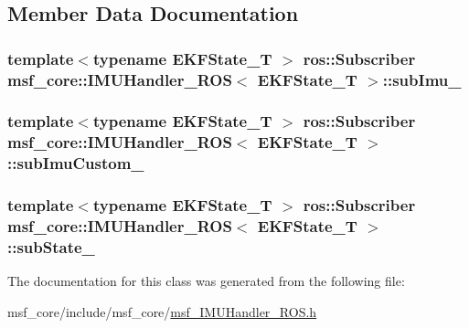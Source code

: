 \subsection{Member Data Documentation}
\hypertarget{classmsf__core_1_1IMUHandler__ROS_a32b7e18f5fc3bf0a7de15ab8ca0bc9f9}{
\subsubsection[{sub\-Imu\-\_\-}]{\setlength{\rightskip}{0pt plus 5cm}template$<$typename E\-K\-F\-State\-\_\-\-T $>$ ros\-::\-Subscriber {\bf msf\-\_\-core\-::\-I\-M\-U\-Handler\-\_\-\-R\-O\-S}$<$ E\-K\-F\-State\-\_\-\-T $>$\-::sub\-Imu\-\_\-\hspace{0.3cm}{\ttfamily [private]}}}\label{classmsf__core_1_1IMUHandler__ROS_a32b7e18f5fc3bf0a7de15ab8ca0bc9f9}
\hypertarget{classmsf__core_1_1IMUHandler__ROS_ac633011a1f63fc81b16972b3210bd4ec}{
\subsubsection[{sub\-Imu\-Custom\-\_\-}]{\setlength{\rightskip}{0pt plus 5cm}template$<$typename E\-K\-F\-State\-\_\-\-T $>$ ros\-::\-Subscriber {\bf msf\-\_\-core\-::\-I\-M\-U\-Handler\-\_\-\-R\-O\-S}$<$ E\-K\-F\-State\-\_\-\-T $>$\-::sub\-Imu\-Custom\-\_\-\hspace{0.3cm}{\ttfamily [private]}}}\label{classmsf__core_1_1IMUHandler__ROS_ac633011a1f63fc81b16972b3210bd4ec}
\hypertarget{classmsf__core_1_1IMUHandler__ROS_adf8d6fabf4ae2fffd11e82c6c8762f10}{
\subsubsection[{sub\-State\-\_\-}]{\setlength{\rightskip}{0pt plus 5cm}template$<$typename E\-K\-F\-State\-\_\-\-T $>$ ros\-::\-Subscriber {\bf msf\-\_\-core\-::\-I\-M\-U\-Handler\-\_\-\-R\-O\-S}$<$ E\-K\-F\-State\-\_\-\-T $>$\-::sub\-State\-\_\-\hspace{0.3cm}{\ttfamily [private]}}}\label{classmsf__core_1_1IMUHandler__ROS_adf8d6fabf4ae2fffd11e82c6c8762f10}


The documentation for this class was generated from the following file\-:\begin{DoxyCompactItemize}
\item 
msf\-\_\-core/include/msf\-\_\-core/\hyperlink{msf__IMUHandler__ROS_8h}{msf\-\_\-\-I\-M\-U\-Handler\-\_\-\-R\-O\-S.\-h}\end{DoxyCompactItemize}
